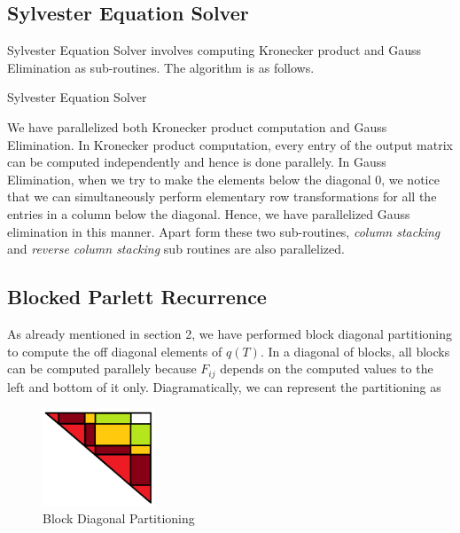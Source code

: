 \documentclass[12pt,a4paper]{article}
\begin{document}
\subsection{Sylvester Equation Solver}

Sylvester Equation Solver involves computing Kronecker product and Gauss Elimination as sub-routines. The algorithm is as follows.

\begin{algorithm}
\caption{Sylvester Equation Solver}\label{euclid}
\begin{algorithmic}[1]
\State {}
\end{algorithmic}
\end{algorithm}

We have parallelized both Kronecker product computation and Gauss Elimination. In Kronecker product computation, every entry of the output matrix can be computed independently and hence is done parallely. In Gauss Elimination, when we try to make the elements below the diagonal 0, we notice that we can simultaneously perform elementary row transformations for all the entries in a column below the diagonal. Hence, we have parallelized Gauss elimination in this manner. Apart form these two sub-routines, \textit{column stacking} and \textit{reverse column stacking} sub routines are also parallelized.

\newpage
\subsection{Blocked Parlett Recurrence}

As already mentioned in section 2, we have performed block diagonal partitioning to compute the off diagonal elements of $q(T)$. In a diagonal of blocks, all blocks can be computed parallely because $F_{ij}$ depends on the computed values to the left and bottom of it only.
Diagramatically, we can represent the partitioning as


\begin{figure}
    \centering
    \includegraphics[width=0.30\textwidth]{Sylvester_blocks.png}
    \caption{Block Diagonal Partitioning}
\end{figure}
\end{document}
